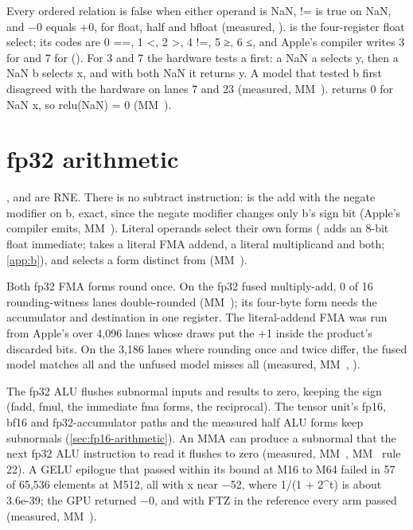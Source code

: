 Every ordered relation is false when either operand is NaN, != is true on NaN, and −0 equals +0, for float, half and
bfloat (measured, ).  is the four-register float
select; its codes are 0 ==, 1 \textless, 2 \textgreater, 4 !=, 5 ≥, 6 ≤, and Apple's compiler writes 3 for  and 7 for
 (). For 3 and 7 the hardware tests a first: a NaN a selects y, then a NaN b selects x, and with
both NaN it returns y. A model that tested b first disagreed with the hardware on lanes 7 and 23 (measured, MM~).  returns 0 for NaN x, so relu(NaN) = 0 (MM~).

\section{fp32 arithmetic}\label{sec:fp32-arithmetic}

,  and  are RNE. There is no subtract instruction:  is the add with the negate modifier on b, exact, since the negate modifier
changes only b's sign bit (Apple's compiler emits, MM~). Literal operands select their own forms (
adds an 8-bit float immediate;  takes a literal FMA addend,  a literal multiplicand and  both;
\cref{app:b}), and  selects a form distinct from  (MM~).

Both fp32 FMA forms round once. On the fp32 fused multiply-add, 0 of 16 rounding-witness lanes double-rounded
(MM~); its four-byte form needs the accumulator and destination in one register. The literal-addend FMA was
run from Apple's  over 4,096 lanes whose draws put the +1 inside the product's discarded
bits. On the 3,186 lanes where rounding once and twice differ, the fused model matches all and the unfused model misses
all (measured, MM~, ).

The fp32 ALU flushes subnormal inputs and results to zero, keeping the sign (fadd, fmul, the immediate fma forms, the
reciprocal). The tensor unit's fp16, bf16 and fp32-accumulator paths and the measured half ALU forms keep subnormals
(\cref{sec:fp16-arithmetic}). An MMA can produce a subnormal that the next fp32 ALU
instruction to read it flushes to zero (measured, MM~, MM~ rule 22). A GELU epilogue that passed within its
bound at M16 to M64 failed in 57 of 65,536 elements at M512, all with x near −52, where 1/(1 + 2\^{}t) is about 3.6e-39;
the GPU returned −0, and with FTZ in the reference every arm passed (measured, MM~).


